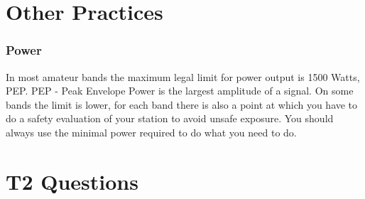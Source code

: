\documentclass[10pt]{beamer}
\begin{document}
\section{Other Practices}

\begin{frame}
\frametitle{Power}
In most amateur bands the maximum legal limit for power output is 1500 Watts, PEP. PEP - Peak Envelope Power is the largest amplitude of a signal. On some bands the limit is lower, for each band there is also a point at which you have to do a safety evaluation of your station to avoid unsafe exposure. You should always use the minimal power required to do what you need to do.
\end{frame}

\section{T2 Questions}
\end{document}
